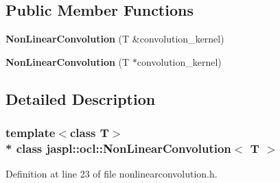\subsection*{Public Member Functions}
\begin{DoxyCompactItemize}
\item 
{\bfseries Non\+Linear\+Convolution} (T \&convolution\+\_\+kernel)\hypertarget{classjaspl_1_1ocl_1_1_non_linear_convolution_a85fb33c4e6d02633ca25df3d3d659a3c}{}\label{classjaspl_1_1ocl_1_1_non_linear_convolution_a85fb33c4e6d02633ca25df3d3d659a3c}

\item 
{\bfseries Non\+Linear\+Convolution} (T $\ast$convolution\+\_\+kernel)\hypertarget{classjaspl_1_1ocl_1_1_non_linear_convolution_a05dfb729106ccc73d7e1d31ba5b98694}{}\label{classjaspl_1_1ocl_1_1_non_linear_convolution_a05dfb729106ccc73d7e1d31ba5b98694}

\end{DoxyCompactItemize}


\subsection{Detailed Description}
\subsubsection*{template$<$class T$>$\\*
class jaspl\+::ocl\+::\+Non\+Linear\+Convolution$<$ T $>$}



Definition at line 23 of file nonlinearconvolution.\+h.

